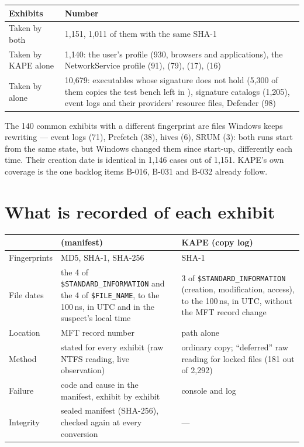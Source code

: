 \documentclass[11pt,a4paper,oneside]{report}
\begin{document}
\begin{longtable}{@{}L{6.4cm}L{8.6cm}@{}}
\toprule
\textbf{Exhibits} & \textbf{Number} \\
\midrule\endhead
Taken by both & 1,151, 1,011 of them with the same SHA-1 \\
Taken by KAPE alone & 1,140: the user's profile (930, browsers and
  applications), the NetworkService profile (91),  (79),
   (17),  (16) \\
Taken by \wac{} alone & 10,679: executables whose signature does not hold
  (5,300 of them copies the test bench left in ), signature catalogs (1,205), event logs and their providers'
  resource files, Defender (98) \\
\bottomrule
\end{longtable}

The 140 common exhibits with a different fingerprint are files Windows keeps
rewriting --- event logs (71), Prefetch (38), hives (6), SRUM (3): both runs
start from the same state, but Windows changed them since start-up,
differently each time. Their creation date is identical in 1,146 cases out of
1,151. KAPE's own coverage is the one backlog items B-016, B-031 and B-032
already follow.

\section{What is recorded of each exhibit}

\begin{longtable}{@{}L{3.6cm}L{6.0cm}L{5.4cm}@{}}
\toprule
 & \textbf{\wac{} (manifest)} & \textbf{KAPE (copy log)} \\
\midrule\endhead
Fingerprints & MD5, SHA-1, SHA-256 & SHA-1 \\
File dates & the 4 of \texttt{\$STANDARD\_INFORMATION} and the 4 of
  \texttt{\$FILE\_NAME}, to the 100\,ns, in UTC and in the suspect's local
  time & 3 of \texttt{\$STANDARD\_INFORMATION} (creation, modification,
  access), to the 100\,ns, in UTC, without the MFT record change \\
Location & MFT record number & path alone \\
Method & stated for every exhibit (raw NTFS reading, live observation) &
  ordinary copy; ``deferred'' raw reading for locked files (181 out of 2,292) \\
Failure & code and cause in the manifest, exhibit by exhibit & console and log \\
Integrity & sealed manifest (SHA-256), checked again at every conversion & --- \\
\bottomrule
\end{longtable}
\end{document}
